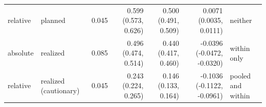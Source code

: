 \begin{tabular}{llrrrrl}
relative & planned & 0.045 & 0.599 (0.573, 0.626) & 0.500 (0.491, 0.509) & 0.0071 (0.0035, 0.0111) & neither \\
absolute & realized & 0.085 & 0.496 (0.474, 0.514) & 0.440 (0.417, 0.460) & -0.0396 (-0.0472, -0.0320) & within only \\
relative & realized (cautionary) & 0.045 & 0.243 (0.224, 0.265) & 0.146 (0.133, 0.164) & -0.1036 (-0.1122, -0.0961) & pooled and within \\
\bottomrule
\end{tabular}
